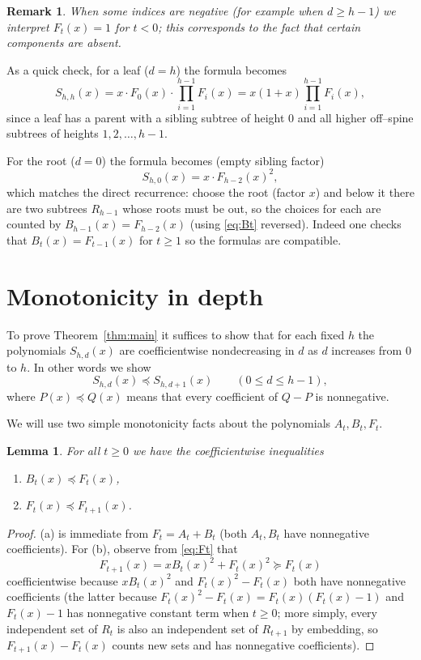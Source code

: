 \documentclass[11pt]{article}
\newtheorem{lemma}[theorem]{Lemma}
\newtheorem{remark}[theorem]{Remark}
\begin{document}
\begin{remark}
	When some indices are negative (for example when $d\ge h-1$) we interpret $F_t(x)=1$ for $t<0$; this corresponds to the fact that certain components are absent.
\end{remark}

As a quick check, for a leaf ($d=h$) the formula becomes
\[
	S_{h,h}(x)=x\cdot F_0(x)\cdot\prod_{i=1}^{h-1} F_i(x)=x(1+x)\prod_{i=1}^{h-1}F_i(x),
\]
since a leaf has a parent with a sibling subtree of height $0$ and all higher off--spine subtrees of heights $1,2,\dots,h-1$.

For the root ($d=0$) the formula becomes (empty sibling factor)
\[
	S_{h,0}(x)=x\cdot F_{h-2}(x)^2,
\]
which matches the direct recurrence: choose the root (factor $x$) and below it there are two subtrees $R_{h-1}$ whose roots must be out, so the choices for each are counted by $B_{h-1}(x)=F_{h-2}(x)$ (using \eqref{eq:Bt} reversed). Indeed one checks that $B_t(x)=F_{t-1}(x)$ for $t\ge1$ so the formulas are compatible.

\section{Monotonicity in depth}

To prove Theorem~\ref{thm:main} it suffices to show that for each fixed $h$ the polynomials $S_{h,d}(x)$ are coefficientwise nondecreasing in $d$ as $d$ increases from $0$ to $h$. In other words we show
\[
	S_{h,d}(x)\preceq S_{h,d+1}(x)\qquad(0\le d\le h-1),
\]
where $P(x)\preceq Q(x)$ means that every coefficient of $Q-P$ is nonnegative.

We will use two simple monotonicity facts about the polynomials $A_t,B_t,F_t$.

\begin{lemma}\label{lem:mono}
	For all $t\ge0$ we have the coefficientwise inequalities
	\begin{enumerate}[label=(\alph*),nosep]
		\item $B_t(x)\preceq F_t(x)$,
		\item $F_t(x)\preceq F_{t+1}(x)$.
	\end{enumerate}
\end{lemma}
\begin{proof}
	(a) is immediate from $F_t=A_t+B_t$ (both $A_t,B_t$ have nonnegative coefficients). For (b), observe from \eqref{eq:Ft} that
	\[F_{t+1}(x)=xB_t(x)^2+F_t(x)^2\succeq F_t(x)
	\]
	coefficientwise because $xB_t(x)^2$ and $F_t(x)^2-F_t(x)$ both have nonnegative coefficients (the latter because $F_t(x)^2-F_t(x)=F_t(x)(F_t(x)-1)$ and $F_t(x)-1$ has nonnegative constant term when $t\ge0$; more simply, every independent set of $R_t$ is also an independent set of $R_{t+1}$ by embedding, so $F_{t+1}(x)-F_t(x)$ counts new sets and has nonnegative coefficients).
\end{proof}
\end{document}
